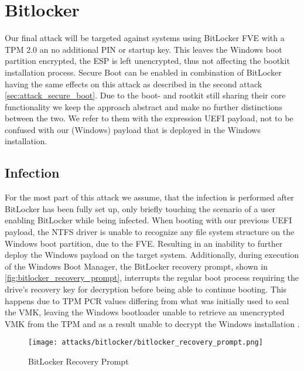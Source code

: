 \section{Bitlocker}

Our final attack will be targeted against systems using BitLocker \ac{FVE} with a \ac{TPM} 2.0 an no additional PIN or startup key. This leaves the Windows boot partition encrypted, the \ac{ESP} is left unencrypted, thus not affecting the bootkit installation process. Secure Boot can be enabled in combination of BitLocker having the same effects on this attack as described in the second attack \autoref{sec:attack_secure_boot}. Due to the boot- and rootkit still sharing their core functionality we keep the approach abstract and make no further distinctions between the two. We refer to them with the expression \ac{UEFI} payload, not to be confused with our (Windows) payload that is deployed in the Windows installation.

\subsection{Infection}

For the most part of this attack we assume, that the infection is performed after BitLocker has been fully set up, only briefly touching the scenario of a user enabling BitLocker while being infected. When booting with our previous \ac{UEFI} payload, the \ac{NTFS} driver is unable to recognize any file system structure  on the Windows boot partition, due to the \ac{FVE}. Resulting in an inability to further deploy the Windows payload on the target system. Additionally, during execution of the Windows Boot Manager, the BitLocker recovery prompt, shown in \autoref{fig:bitlocker_recovery_prompt}, interrupts the regular boot process requiring the drive's recovery key for decryption before being able to continue booting.
This happens due to \ac{TPM} \ac{PCR} values differing from what was initially used to seal the \ac{VMK}, leaving the Windows bootloader unable to retrieve an unencrypted \ac{VMK} from the \ac{TPM} and as a result unable to decrypt the Windows installation \cite[12.]{windows-internals-7-part2}.

\begin{figure}[htb]
    \centering
    \texttt{[image: attacks/bitlocker/bitlocker\_recovery\_prompt.png]}
    \caption{BitLocker Recovery Prompt}
    \label{fig:bitlocker_recovery_prompt}
\end{figure}

